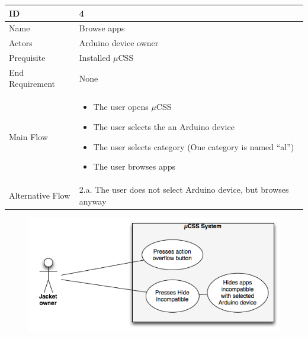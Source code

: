         \begin{table}
        \begin{tabular}{|l|l|}
            \hline
            ID               & 4 \\ \hline
            Name             & Browse apps \\
            Actors           & Arduino device owner \\
            Prequisite       & Installed $\mu$CSS \\
            End Requirement  & None \\
            Main Flow        &      
                    \begin{itemize}
                    \item{The user opens $\mu$CSS}
                    \item{The user selects the an Arduino device}
                    \item{The user selects category (One category is named ``al'')}
                    \item{The user browses apps}
                    \end{itemize} \\
            Alternative Flow & 2.a. The user does not select Arduino device, but browses anyway
           \\ \hline
        \end{tabular}
    \end{table}



\begin{figure}[H]
\centering
\includegraphics[scale=1]{images/UseCase5}
\end{figure}



